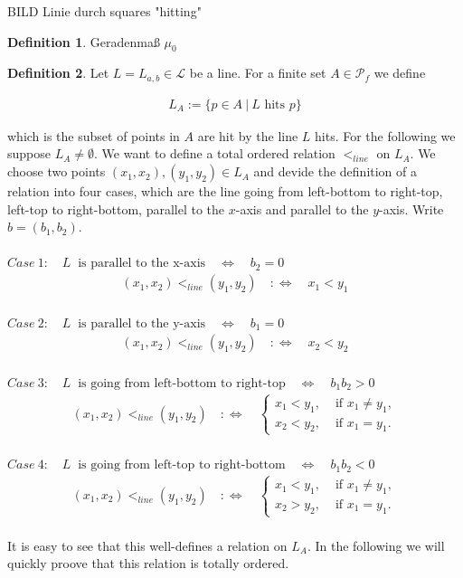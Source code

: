 \documentclass[12pt,a4paper]{scrartcl}
\numberwithin{equation}{subsection}
\newcommand{\1}{\mathbbm{1}}
\numberwithin{equation}{section}
\theoremstyle{definition}
\newtheorem{definition}{Definition}[subsection]
\begin{document}
BILD Linie durch squares "hitting"\\


\begin{definition}
	Geradenmaß $\mu_0$
\end{definition}


\begin{definition}
	Let $L=L_{a,b}\in \mathcal{L}$ be a line. For a finite set $A\in \mathcal{P}_f$ we define 
	
	\begin{align*}
		L_{A} := \{ p\in A\ |\ L \text{ hits } p\}
	\end{align*}
	
	which is the subset of points in $A$ are hit by the line $L$ hits. For the following we suppose $L_A \neq \emptyset$. We want to define a total ordered relation $<_{line}$ on $L_A$. We choose two points $(x_1,x_2),(y_1,y_2)\in L_A$ and devide the definition of a relation into four cases, which are the line going from left-bottom to right-top, left-top to right-bottom, parallel to the $x$-axis and parallel to the $y$-axis. Write $b=(b_1,b_2)$.  \\
	\\
	$\mathit{Case\ 1:}\quad L\ \text{ is parallel to the x-axis}\quad \Leftrightarrow\quad b_2=0$
	\begin{align*}
	(x_1, x_2) <_{line} (y_1, y_2) \quad :\Leftrightarrow \quad x_1 < y_1
	\end{align*}\\
	$\mathit{Case\ 2:}\quad L\ \text{ is parallel to the y-axis}\quad \Leftrightarrow\quad b_1=0$
	\begin{align*}
	(x_1, x_2) <_{line} (y_1, y_2) \quad :\Leftrightarrow \quad x_2 < y_2
	\end{align*}\\
	$\mathit{Case\ 3:}\quad L\ \text{ is going from left-bottom to right-top}\quad \Leftrightarrow\quad b_1b_2>0$
	\begin{align*}
	(x_1, x_2) <_{line} (y_1, y_2) \quad :\Leftrightarrow \quad
		\begin{cases}
			x_1 < y_1, & \text{ if } x_1 \neq y_1, \\
			x_2 < y_2, & \text{ if } x_1 = y_1.
		\end{cases}
	\end{align*}\\
	$\mathit{Case\ 4:}\quad L\ \text{ is going from left-top to right-bottom}\quad \Leftrightarrow\quad b_1b_2<0$
	\begin{align*}
	(x_1, x_2) <_{line} (y_1, y_2) \quad :\Leftrightarrow \quad
	\begin{cases}
	x_1 < y_1, & \text{ if } x_1 \neq y_1, \\
	x_2 > y_2, & \text{ if } x_1 = y_1.
	\end{cases}
	\end{align*}\\
	It is easy to see that this well-defines a relation on $L_A$. In the following we will quickly proove that this relation is totally ordered. 
\end{definition}
\end{document}
